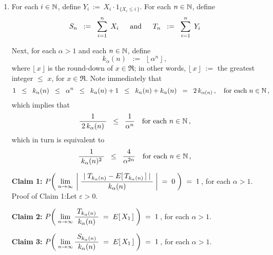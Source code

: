 \begin{enumerate}
\item

For each $i \in \mathbb{N}$, define $Y_{i} \,:=\, X_{i} \cdot 1_{\{X_{i} \leq i\,\}}$.
For each $n \in \mathbb{N}$, define
\begin{equation*}
S_{n} \;\; := \;\; \overset{n}{\underset{i=1}{\sum}} \;\, X_{i}
\quad\;\;\textnormal{and}\quad\;\;
T_{n} \;\; := \;\; \overset{n}{\underset{i=1}{\sum}} \;\, Y_{i}
\end{equation*}

Next, for each $\alpha > 1$ and each $n \in \mathbb{N}$, define
\begin{equation*}
k_{\alpha}(n)
\;\; := \;\;
	\lfloor\, \alpha^{n} \,\rfloor\,,
\end{equation*}
where $\lfloor\,x\,\rfloor$ is the round-down of $x \in \Re$; in other words,
$\lfloor\,x\,\rfloor$ \;$:=$\; the greatest integer $\leq$ $x$, for $x \in \Re$.
Note immediately that
\begin{equation*}
1 \;\;\leq\;\; k_{\alpha}(n) \;\;\leq\;\; \alpha^{n} \;\;\leq\;\; k_{\alpha}(n) + 1
\;\;\leq\;\; k_{\alpha}(n) + k_{\alpha}(n) \;\;=\;\; 2\,k_{\alpha(n)}\,,
\quad
\textnormal{for each $n \in \mathbb{N}$}\,,
\end{equation*}
which implies that
\begin{equation*}
\dfrac{1}{{\color{white}.}2\,k_{\alpha}(n){\color{white}.}} \;\;\leq\;\; \dfrac{1}{\alpha^{n}}
\quad
\textnormal{for each $n \in \N$}\,,
\end{equation*}
which in turn is equivalent to
\begin{equation*}
\dfrac{1}{{\color{white}.}k_{\alpha}(n)^{2}{\color{white}.}} \;\;\leq\;\; \dfrac{4}{\alpha^{2n}}
\quad
\textnormal{for each $n \in \N$}\,,
\end{equation*}

\vskip 0.5cm
\noindent
\textbf{Claim 1:}\quad\quad
$P\!\left(\;
	\underset{n\rightarrow\infty}{\lim}\;
	\left\vert\;
		\dfrac{{\color{white}.}\vert\;T_{k_{\alpha}(n)} - E[\,T_{k_{\alpha}(n)}\,]\;\vert{\color{white}.}}{k_{\alpha}(n)}
		\;\right\vert
	\;=\;0
	\;\right)
\;=\;1$\,, for each $\alpha > 1$.
\vskip 0.3cm
\noindent
Proof of Claim 1:\quad Let $\varepsilon > 0$.

\vskip 0.8cm
\noindent
\textbf{Claim 2:}\quad\quad
$P\!\left(\;
	\underset{n\rightarrow\infty}{\lim}\,
	\dfrac{{\color{white}.}T_{k_{\alpha}(n)}{\color{white}.}}{k_{\alpha}(n)} \;=\; E[\,X_{1}\,]
	\;\right)
\;=\;1$\,, for each $\alpha > 1$.

\vskip 0.8cm
\noindent
\textbf{Claim 3:}\quad\quad
$P\!\left(\;
	\underset{n\rightarrow\infty}{\lim}\,
	\dfrac{{\color{white}.}S_{k_{\alpha}(n)}{\color{white}.}}{k_{\alpha}(n)} \;=\; E[\,X_{1}\,]
	\;\right)
\;=\;1$\,, for each $\alpha > 1$.


\end{enumerate}
